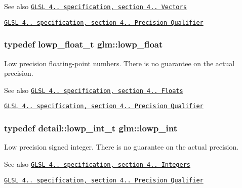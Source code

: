 \begin{DoxySeeAlso}{See also}
\href{http://www.opengl.org/registry/doc/GLSLangSpec.4.20.8.pdf}{\tt G\+L\+SL 4.. specification, section 4.. Vectors} 

\href{http://www.opengl.org/registry/doc/GLSLangSpec.4.20.8.pdf}{\tt G\+L\+SL 4.. specification, section 4.. Precision Qualifier} 
\end{DoxySeeAlso}
\subsubsection[{\texorpdfstring{lowp\+\_\+float}{lowp_float}}]{\setlength{\rightskip}{0pt plus 5cm}typedef lowp\+\_\+float\+\_\+t {\bf glm\+::lowp\+\_\+float}}\hypertarget{group__core__precision_ga2887fbc729ac5c1c5caeb7cd57a7145c}{}\label{group__core__precision_ga2887fbc729ac5c1c5caeb7cd57a7145c}
Low precision floating-\/point numbers. There is no guarantee on the actual precision.

\begin{DoxySeeAlso}{See also}
\href{http://www.opengl.org/registry/doc/GLSLangSpec.4.20.8.pdf}{\tt G\+L\+SL 4.. specification, section 4.. Floats} 

\href{http://www.opengl.org/registry/doc/GLSLangSpec.4.20.8.pdf}{\tt G\+L\+SL 4.. specification, section 4.. Precision Qualifier} 
\end{DoxySeeAlso}
\subsubsection[{\texorpdfstring{lowp\+\_\+int}{lowp_int}}]{\setlength{\rightskip}{0pt plus 5cm}typedef detail\+::lowp\+\_\+int\+\_\+t {\bf glm\+::lowp\+\_\+int}}\hypertarget{group__core__precision_ga4681244bf4a184734f03aa9df4e3d288}{}\label{group__core__precision_ga4681244bf4a184734f03aa9df4e3d288}
Low precision signed integer. There is no guarantee on the actual precision.

\begin{DoxySeeAlso}{See also}
\href{http://www.opengl.org/registry/doc/GLSLangSpec.4.20.8.pdf}{\tt G\+L\+SL 4.. specification, section 4.. Integers} 

\href{http://www.opengl.org/registry/doc/GLSLangSpec.4.20.8.pdf}{\tt G\+L\+SL 4.. specification, section 4.. Precision Qualifier} 
\end{DoxySeeAlso}
